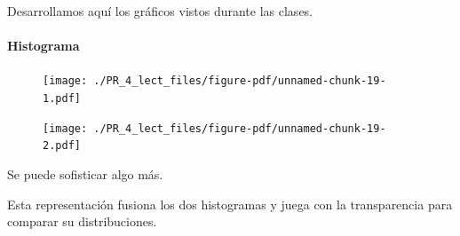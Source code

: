 \documentclass[
  letterpaper,
  DIV=11,
  numbers=noendperiod]{scrreprt}
\let\oldparagraph\paragraph
\renewcommand{\paragraph}[1]{\oldparagraph{#1}\mbox{}}
\newenvironment{Shaded}{\begin{snugshade}}{\end{snugshade}}
\newcommand{\AttributeTok}[1]{\textcolor[rgb]{0.40,0.45,0.13}{#1}}
\newcommand{\CommentTok}[1]{\textcolor[rgb]{0.37,0.37,0.37}{#1}}
\newcommand{\FunctionTok}[1]{\textcolor[rgb]{0.28,0.35,0.67}{#1}}
\newcommand{\NormalTok}[1]{\textcolor[rgb]{0.00,0.23,0.31}{#1}}
\newcommand{\SpecialCharTok}[1]{\textcolor[rgb]{0.37,0.37,0.37}{#1}}
\newcommand{\StringTok}[1]{\textcolor[rgb]{0.13,0.47,0.30}{#1}}
\begin{document}
Desarrollamos aquí los gráficos vistos durante las clases.

\hypertarget{histograma}{%
\paragraph{Histograma}\label{histograma}}

\begin{Shaded}
\end{Shaded}

\begin{figure}[H]

{\centering \texttt{[image: ./PR\_4\_lect\_files/figure-pdf/unnamed-chunk-19-1.pdf]}

}

\end{figure}

\begin{Shaded}
\end{Shaded}

\begin{figure}[H]

{\centering \texttt{[image: ./PR\_4\_lect\_files/figure-pdf/unnamed-chunk-19-2.pdf]}

}

\end{figure}

Se puede sofisticar algo más.

Esta representación fusiona los dos histogramas y juega con la
transparencia para comparar su distribuciones.
\end{document}
